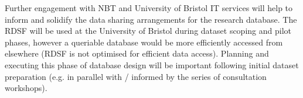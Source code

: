 \documentclass{article}
\begin{document}
Further engagement with NBT and University of Bristol IT services will
help to inform and solidify the data sharing arrangements for the
research database. The RDSF will be used at the University of Bristol
during dataset scoping and pilot phases, however a queriable database
would be more efficiently accessed from elsewhere (RDSF is not
optimised for efficient data access). Planning and executing this
phase of database design will be important following initial dataset
preparation (e.g. in parallel with / informed by the series of
consultation workshops).


\end{document}
